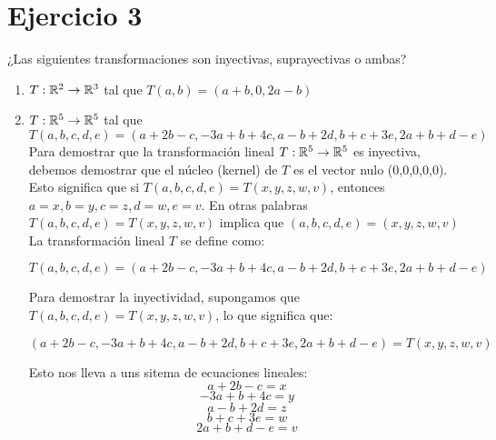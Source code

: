 \section*{Ejercicio 3}

¿Las siguientes transformaciones son inyectivas, suprayectivas o ambas?

\begin{enumerate}
    \item $T: \mathbb{R}^{2} \rightarrow \mathbb{R}^{3}$ tal que $T(a,b) = (a + b, 0, 2a - b)$
    



    \item $T: \mathbb{R}^{5} \rightarrow \mathbb{R}^{5}$ tal que $T(a,b,c,d,e)  = (a + 2b -c, -3a + b + 4c, a - b + 2d, b + c +3e, 2a + b + d - e)$\\


      Para demostrar que la transformación lineal $T: \mathbb{R}^{5} \rightarrow \mathbb{R}^{5}$ es inyectiva, debemos demostrar
      que el núcleo (kernel) de $T$ es el vector nulo (0,0,0,0,0). Esto significa que si $T(a,b,c,d,e) = T(x,y,z,w,v)$,
      entonces $a = x, b = y, c = z, d = w, e = v$. En otras palabras $T(a,b,c,d,e) = T(x,y,z,w,v)$ implica que 
      $(a,b,c,d,e) = (x,y,z,w,v)$\\

      La transformación lineal $T$ se define como:

      \begin{equation*}
            T(a,b,c,d,e)  = (a + 2b -c, -3a + b + 4c, a - b + 2d, b + c +3e, 2a + b + d - e)
      \end{equation*}

      Para demostrar la inyectividad, supongamos que $T(a,b,c,d,e) = T(x,y,z,w,v)$, lo que significa que:

      \begin{equation*}
            (a + 2b -c, -3a + b + 4c, a - b + 2d, b + c + 3e, 2a + b + d - e) = T(x,y,z,w,v) 
      \end{equation*}

      Esto nos lleva a uns sitema de ecuaciones lineales: 
      \begin{equation}
            a + 2b -c = x \tag{3.1} \label{ec3.1}
      \end{equation}
      \begin{equation*}
            -3a + b + 4c = y \tag{3.2} \label{ec3.2}
      \end{equation*}
      \begin{equation}
            a - b + 2d = z \tag{3.3} \label{ec3.3}
      \end{equation}
      \begin{equation}
            b + c + 3e = w \tag{3.4} \label{ec3.4}
      \end{equation}
      \begin{equation}
            2a + b + d - e = v \tag{3.5} \label{ec3.5} 
      \end{equation}


\end{enumerate}
